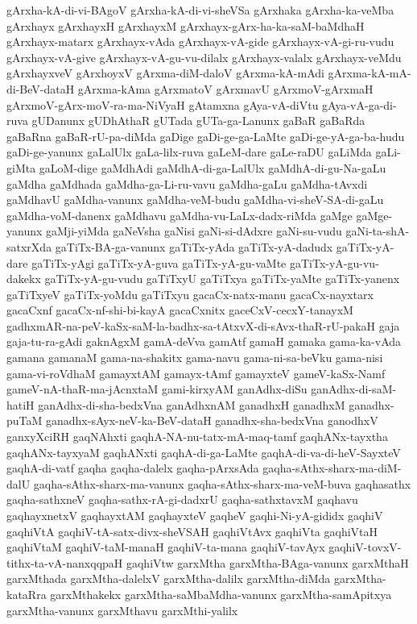 {gArxha-kA-di-vi-BAgoV
gArxha-kA-di-vi-sheVSa
gArxhaka
gArxha-ka-veMba
gArxhayx
gArxhayxH
gArxhayxM
gArxhayx-gArx-ha-ka-saM-baMdhaH
gArxhayx-matarx
gArxhayx-vAda
gArxhayx-vA-gide
gArxhayx-vA-gi-ru-vudu
gArxhayx-vA-give
gArxhayx-vA-gu-vu-dilalx
gArxhayx-valalx
gArxhayx-veMdu
gArxhayxveV
gArxhoyxV
gArxma-diM-daloV
gArxma-kA-mAdi
gArxma-kA-mA-di-BeV-dataH
gArxma-kAma
gArxmatoV
gArxmavU
gArxmoV-gArxmaH
gArxmoV-gArx-moV-ra-ma-NiVyaH
gAtamxna
gAya-vA-diVtu
gAya-vA-ga-di-ruva
gUDanunx
gUDhAthaR
gUTada
gUTa-ga-Lanunx
gaBaR
gaBaRda
gaBaRna
gaBaR-rU-pa-diMda
gaDige
gaDi-ge-ga-LaMte
gaDi-ge-yA-ga-ba-hudu
gaDi-ge-yanunx
gaLalUlx
gaLa-lilx-ruva
gaLeM-dare
gaLe-raDU
gaLiMda
gaLi-giMta
gaLoM-dige
gaMdhAdi
gaMdhA-di-ga-LalUlx
gaMdhA-di-gu-Na-gaLu
gaMdha
gaMdhada
gaMdha-ga-Li-ru-vavu
gaMdha-gaLu
gaMdha-tAvxdi
gaMdhavU
gaMdha-vanunx
gaMdha-veM-budu
gaMdha-vi-sheV-SA-di-gaLu
gaMdha-voM-danenx
gaMdhavu
gaMdha-vu-LaLx-dadx-riMda
gaMge
gaMge-yanunx
gaMji-yiMda
gaNeVsha
gaNisi
gaNi-si-dAdxre
gaNi-su-vudu
gaNi-ta-shA-satxrXda
gaTiTx-BA-ga-vanunx
gaTiTx-yAda
gaTiTx-yA-dadudx
gaTiTx-yA-dare
gaTiTx-yAgi
gaTiTx-yA-guva
gaTiTx-yA-gu-vaMte
gaTiTx-yA-gu-vu-dakekx
gaTiTx-yA-gu-vudu
gaTiTxyU
gaTiTxya
gaTiTx-yaMte
gaTiTx-yanenx
gaTiTxyeV
gaTiTx-yoMdu
gaTiTxyu
gacaCx-natx-manu
gacaCx-nayxtarx
gacaCxnf
gacaCx-nf-shi-bi-kayA
gacaCxnitx
gaceCxV-cecxY-tanayxM
gadhxmAR-na-peV-kaSx-saM-la-badhx-sa-tAtxvX-di-sAvx-thaR-rU-pakaH
gaja
gaja-tu-ra-gAdi
gaknAgxM
gamA-deVva
gamAtf
gamaH
gamaka
gama-ka-vAda
gamana
gamanaM
gama-na-shakitx
gama-navu
gama-ni-sa-beVku
gama-nisi
gama-vi-roVdhaM
gamayxtAM
gamayx-tAmf
gamayxteV
gameV-kaSx-Namf
gameV-nA-thaR-ma-jAcnxtaM
gami-kirxyAM
ganAdhx-diSu
ganAdhx-di-saM-hatiH
ganAdhx-di-sha-bedxVna
ganAdhxnAM
ganadhxH
ganadhxM
ganadhx-puTaM
ganadhx-sAyx-neV-ka-BeV-dataH
ganadhx-sha-bedxVna
ganodhxV
ganxyXciRH
gaqNAhxti
gaqhA-NA-nu-tatx-mA-maq-tamf
gaqhANx-tayxtha
gaqhANx-tayxyaM
gaqhANxti
gaqhA-di-ga-LaMte
gaqhA-di-va-di-heV-SayxteV
gaqhA-di-vatf
gaqha
gaqha-dalelx
gaqha-pArxsAda
gaqha-sAthx-sharx-ma-diM-dalU
gaqha-sAthx-sharx-ma-vanunx
gaqha-sAthx-sharx-ma-veM-buva
gaqhasathx
gaqha-sathxneV
gaqha-sathx-rA-gi-dadxrU
gaqha-sathxtavxM
gaqhavu
gaqhayxnetxV
gaqhayxtAM
gaqhayxteV
gaqheV
gaqhi-Ni-yA-gididx
gaqhiV
gaqhiVtA
gaqhiV-tA-satx-divx-sheVSAH
gaqhiVtAvx
gaqhiVta
gaqhiVtaH
gaqhiVtaM
gaqhiV-taM-manaH
gaqhiV-ta-mana
gaqhiV-tavAyx
gaqhiV-tovxV-tithx-ta-vA-nanxqqpaH
gaqhiVtw
garxMtha
garxMtha-BAga-vanunx
garxMthaH
garxMthada
garxMtha-dalelxV
garxMtha-dalilx
garxMtha-diMda
garxMtha-kataRra
garxMthakekx
garxMtha-saMbaMdha-vanunx
garxMtha-samApitxya
garxMtha-vanunx
garxMthavu
garxMthi-yalilx
}
